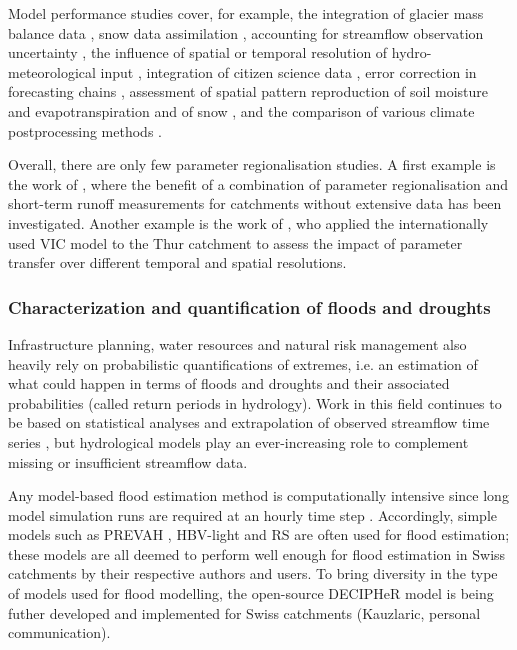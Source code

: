 \documentclass[10pt,a4paper]{article}
\begin{document}
Model performance studies cover, for example, the integration of glacier mass balance data \citep{Finger2015, schaeflihuss11}, snow data assimilation \citep{Griessinger2016}, accounting for streamflow observation uncertainty \citep{Westerberg2020}, the influence of spatial or temporal resolution of hydro-meteorological input \citep{GironsLopez2016, Felder2017, Sikorska2018}, integration of citizen science data \citep{Etter2020}, error correction in forecasting chains \citep{Bogner_2018}, assessment of spatial pattern reproduction of soil moisture and evapotranspiration \citep{Rossler2010, Zappa2003} and of snow \citep{Zappa2008a}, and the comparison of various climate postprocessing methods \citep{Rossler2019}.

Overall, there are only few parameter regionalisation studies. A first example is the work of \citet{Viviroli2015}, where the benefit of a combination of parameter regionalisation and short-term runoff measurements for catchments without extensive data has been investigated. Another example is the work of \citet{Melsen2016}, who applied the internationally used VIC model to the Thur catchment to assess the impact of parameter transfer over different temporal and spatial resolutions.


\subsubsection{Characterization and quantification of floods and droughts}
\label{sec:application:floodsdroughts}

Infrastructure planning, water resources and natural risk management also heavily rely on probabilistic quantifications of extremes, i.e. an estimation of what could happen in terms of floods and droughts and their associated probabilities (called return periods in hydrology). Work in this field continues to be based on statistical analyses and extrapolation of observed streamflow time series \citep{Brunner2018, Asadi20108}, but hydrological models play an ever-increasing role to complement missing or insufficient streamflow data.

Any model-based flood estimation method is computationally intensive since long model simulation runs are required at an hourly time step \citep[see][about reducing computational requirements for extreme flood estimation by hydrological modelling]{Sikorska-Senoner2020}. Accordingly, simple models such as PREVAH \citep{Viviroli_2009, Viviroli2009c, Felder2017}, HBV-light \citep{Sikorska2017, Brunner_2019a, Sikorska-Senoner2020} and  RS \citep{Bieri2013, Zeimetz2017, Zeimetz2018} are often used for flood estimation; these models are all deemed to perform well enough for flood estimation in Swiss catchments by their respective authors and users. To bring diversity in the type of models used for flood modelling, the open-source DECIPHeR model is being futher developed and implemented for Swiss catchments (Kauzlaric, personal communication).
\end{document}
